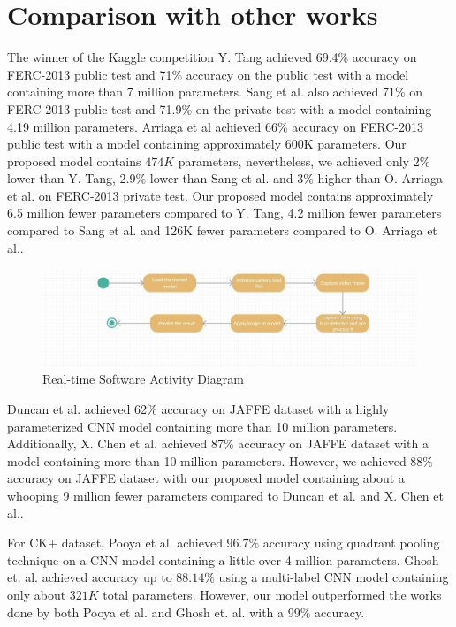 \documentclass[master]{thesis-uestc}
\begin{document}
\section{Comparison with other works}
The winner of the Kaggle competition Y. Tang achieved 69.4\% accuracy on FERC-2013 public test and 71\% accuracy on the public test with a model containing more than 7 million parameters. Sang et al.  also achieved 71\% on FERC-2013 public test and 71.9\% on the private test with a model containing 4.19 million parameters. Arriaga et al achieved 66\% accuracy on FERC-2013 public test with a model containing approximately 600K parameters. Our proposed model contains $474K$ parameters, nevertheless, we achieved only $2\%$ lower than Y. Tang, 2.9\% lower than Sang et al.  and 3\% higher than O. Arriaga et al. on FERC-2013 private test. Our proposed model contains approximately 6.5 million fewer parameters compared to Y. Tang, 4.2 million fewer parameters compared to Sang et al.  and 126K fewer parameters compared to O. Arriaga et al..

\begin{figure}[ht]
\includegraphics[width=5in]{pic/system_activity_diagram.png}
\caption{Real-time Software Activity Diagram}
\label{system_description}
\end{figure}

Duncan et al.  achieved 62\% accuracy on JAFFE dataset with a highly parameterized CNN model containing more than 10 million parameters. Additionally, X. Chen et al. achieved 87\% accuracy on JAFFE dataset with a model containing more than 10 million parameters. However, we achieved $88\%$ accuracy on JAFFE dataset with our proposed model containing about a whooping 9 million fewer parameters compared to Duncan et al. and X. Chen et al..

For CK+ dataset, Pooya et al. achieved $96.7\%$ accuracy using quadrant pooling technique on a CNN model containing a little over 4 million parameters. Ghosh et. al.  achieved accuracy up to $88.14\%$ using a multi-label CNN model containing only about $321K$ total parameters. However, our model outperformed the works done by both Pooya et al. and Ghosh et. al.  with a 99\% accuracy.
\end{document}
